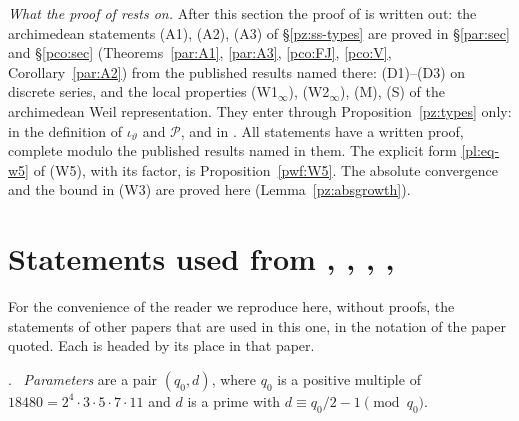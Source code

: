 \documentclass[10pt]{amsart}
\theoremstyle{definition}
\theoremstyle{remark}
\providecommand{\auP}{\mathcal P}
\newenvironment{quoteddef}[2]{\par\medskip\noindent\begingroup
  \textbf{#1}#2.\ \ignorespaces}{\endgroup\par\medskip}
\begin{document}
\emph{What the proof of {\cite[Theorem~14.13]{P46}} rests on.} After this section the proof
of {\cite[Theorem~14.13]{P46}} is written out: the archimedean statements (A1), (A2), (A3) of
\S\ref{pz:ss-types} are proved in \S\ref{par:sec} and \S\ref{pco:sec}
(Theorems~\ref{par:A1}, \ref{par:A3}, \ref{pco:FJ}, \ref{pco:V}, Corollary~\ref{par:A2}) from the
published results named there: (D1)--(D3) on discrete series, and the local properties
(W1$_\infty$), (W2$_\infty$), (M), (S) of the archimedean Weil representation. They enter through
Proposition~\ref{pz:types} only: in the definition of
$\iota_\vartheta$ and $\auP$, and in {\cite[Proposition~14.19]{P46}}. All statements have a
written proof, complete modulo the published results named in them. The explicit form
\eqref{pl:eq-w5} of (W5), with its factor, is Proposition~\ref{pwf:W5}. The absolute convergence and the bound in (W3) are proved here
(Lemma~\ref{pz:absgrowth}).


\appendix

\section{Statements used from \texorpdfstring{\cite{P46}}{[P46]}, \texorpdfstring{\cite{P50}}{[P50]}, \texorpdfstring{\cite{P51}}{[P51]}, \texorpdfstring{\cite{P53}}{[P53]}, \texorpdfstring{\cite{P54}}{[P54]}}\label{A1:quoted}

For the convenience of the reader we reproduce here, without proofs, the statements of other papers that are used in this one, in the notation of the paper quoted. Each is headed by its place in that paper.

\begin{quoteddef}{\cite[Definition~13.1]{P46}}{}
\emph{Parameters} are a pair $(q_0,d)$, where $q_0$ is a positive multiple of
$18480=2^4\cdot3\cdot5\cdot7\cdot11$ and $d$ is a prime with
$d\equiv q_0/2-1\pmod{q_0}$.
\end{quoteddef}
\end{document}
